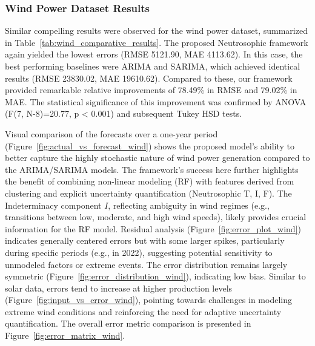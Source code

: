 \documentclass[review,3p,times]{elsarticle}
\begin{document}
\subsubsection{Wind Power Dataset Results}
\label{subsec:wind_results}

Similar compelling results were observed for the wind power dataset, summarized in Table~\ref{tab:wind_comparative_results}. The proposed Neutrosophic framework again yielded the lowest errors (RMSE 5121.90, MAE 4113.62). In this case, the best performing baselines were ARIMA and SARIMA, which achieved identical results (RMSE 23830.02, MAE 19610.62). Compared to these, our framework provided remarkable relative improvements of 78.49\% in RMSE and 79.02\% in MAE. The statistical significance of this improvement was confirmed by ANOVA (F(7, N-8)=20.77, p < 0.001) and subsequent Tukey HSD tests.

Visual comparison of the forecasts over a one-year period (Figure~\ref{fig:actual_vs_forecast_wind}) shows the proposed model's ability to better capture the highly stochastic nature of wind power generation compared to the ARIMA/SARIMA models. The framework's success here further highlights the benefit of combining non-linear modeling (RF) with features derived from clustering and explicit uncertainty quantification (Neutrosophic T, I, F). The Indeterminacy component $I$, reflecting ambiguity in wind regimes (e.g., transitions between low, moderate, and high wind speeds), likely provides crucial information for the RF model. Residual analysis (Figure~\ref{fig:error_plot_wind}) indicates generally centered errors but with some larger spikes, particularly during specific periods (e.g., in 2022), suggesting potential sensitivity to unmodeled factors or extreme events. The error distribution remains largely symmetric (Figure~\ref{fig:error_distribution_wind}), indicating low bias. Similar to solar data, errors tend to increase at higher production levels (Figure~\ref{fig:input_vs_error_wind}), pointing towards challenges in modeling extreme wind conditions and reinforcing the need for adaptive uncertainty quantification. The overall error metric comparison is presented in Figure~\ref{fig:error_matrix_wind}.
\end{document}
